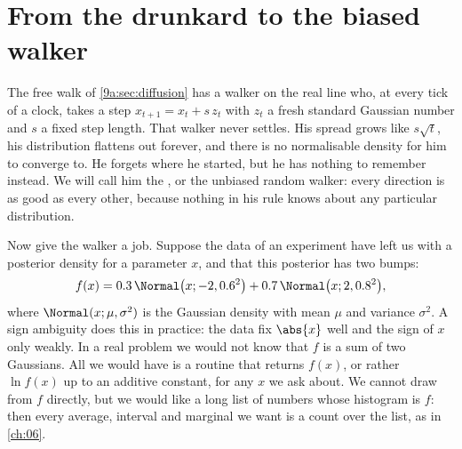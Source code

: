 \providecommand{\NineBIsLogConfigs}{}\renewcommand{\NineBIsLogConfigs}{308.3}
\providecommand{\NineBGhRho}{}\renewcommand{\NineBGhRho}{0.95}
\providecommand{\NineBGhN}{}\renewcommand{\NineBGhN}{50\,000}
\providecommand{\NineBGhGibbsTau}{}\renewcommand{\NineBGhGibbsTau}{18.73}
\providecommand{\NineBGhGibbsTauExact}{}\renewcommand{\NineBGhGibbsTauExact}{19.51}
\providecommand{\NineBGhHmcTau}{}\renewcommand{\NineBGhHmcTau}{0.9427}
\providecommand{\NineBGhHmcAcc}{}\renewcommand{\NineBGhHmcAcc}{0.9737}
\providecommand{\NineBGhEps}{}\renewcommand{\NineBGhEps}{0.15}
\providecommand{\NineBGhLeap}{}\renewcommand{\NineBGhLeap}{15}
\providecommand{\NineBGhHmcJump}{}\renewcommand{\NineBGhHmcJump}{1.646}
\providecommand{\NineBGhHmcDH}{}\renewcommand{\NineBGhHmcDH}{0.05734}
\providecommand{\NineBGhGibbsVar}{}\renewcommand{\NineBGhGibbsVar}{0.9952}
\providecommand{\NineBGhHmcVar}{}\renewcommand{\NineBGhHmcVar}{1.001}
\section{From the drunkard to the biased walker}
\label{9b:sec:biased}

The free walk of \cref{9a:sec:diffusion} has a walker on the real line who,
at every tick of a clock, takes a step $x_{t+1}=x_t+s\,z_t$ with $z_t$ a fresh standard Gaussian
number and $s$ a fixed step length. That walker never settles. His
spread grows like $s\sqrt t$, his distribution flattens out forever, and there is no
normalisable density for him to converge to. He forgets where he started, but he has nothing
to remember instead. We will call him the , or the unbiased random walker:
every direction is as good as every other, because nothing in his rule knows about any
particular distribution.

Now give the walker a job. Suppose the data of an experiment have left us with a posterior
density for a parameter $x$, and that this posterior has two bumps:
\begin{equation}
  f(x)=0.3\,\Normal\bigl(x;-2,0.6^2\bigr)+0.7\,\Normal\bigl(x;2,0.8^2\bigr),
  \label{9b:eq:two-bumps}
\end{equation}
where $\Normal(x;\mu,\sigma^2)$ is the Gaussian density with mean $\mu$ and variance $\sigma^2$.
A sign ambiguity does this in practice: the data fix $\abs{x}$ well and the sign of $x$ only
weakly. In a real problem we would not know that $f$ is a sum of two Gaussians. All we would
have is a routine that returns $f(x)$, or rather $\ln f(x)$ up to an additive constant, for any
$x$ we ask about. We cannot draw from $f$ directly, but we would like a long list of numbers
whose histogram is $f$: then every average, interval and marginal we want is a count over the
list, as in \cref{ch:06}.

